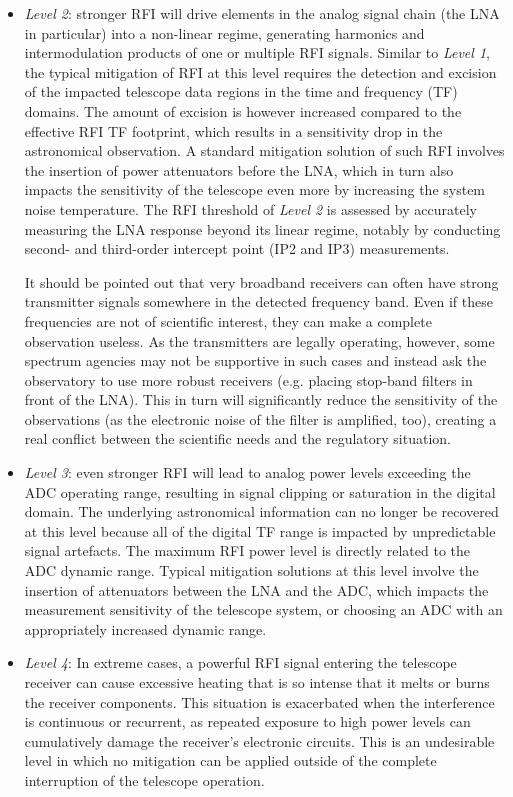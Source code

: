 \begin{itemize}
\item \emph{Level 2}: stronger RFI will drive elements in the analog signal chain (the LNA in particular) into a non-linear regime, generating harmonics and intermodulation products of one or multiple RFI signals. Similar to \emph{Level 1}, the typical mitigation of RFI at this level requires the detection and excision of the impacted telescope data regions in the time and frequency (TF) domains. The amount of excision is however increased compared to the effective RFI TF footprint, which results in a sensitivity drop in the astronomical observation. A standard mitigation solution of such RFI involves the insertion of power attenuators before the LNA, which in turn also impacts the sensitivity of the telescope even more by increasing the system noise temperature. The RFI threshold of \emph{Level 2} is assessed by accurately measuring the LNA response beyond its linear regime, notably by conducting second- and third-order intercept point (IP2 and IP3) measurements.

It should be pointed out that very broadband receivers can often have strong transmitter signals somewhere in the detected frequency band. Even if these frequencies are not of scientific interest, they can make a complete observation useless. As the transmitters are legally operating, however, some spectrum agencies may not be supportive in such cases and instead ask the observatory to use more robust receivers (e.g. placing stop-band filters in front of the LNA). This in turn will significantly reduce the sensitivity of the observations (as the electronic noise of the filter is amplified, too), creating a real conflict between the scientific needs and the regulatory situation. 

\item \emph{Level 3}: even stronger RFI will lead to analog power levels exceeding the ADC operating range, resulting in signal clipping or saturation in the digital domain. The underlying astronomical information can no longer be recovered at this level because all of the digital TF range is impacted by unpredictable signal artefacts. The maximum RFI power level is directly related to the ADC dynamic range. Typical mitigation solutions at this level involve the insertion of attenuators between the LNA and the ADC, which impacts the measurement sensitivity of the telescope system, or choosing an ADC with an appropriately increased dynamic range.

\item \emph{Level 4}: In extreme cases, a powerful RFI signal entering the telescope receiver can cause excessive heating that is so intense that it melts or burns the receiver components. This situation is exacerbated when the interference is continuous or recurrent, as repeated exposure to high power levels can cumulatively damage the receiver's electronic circuits. This is an undesirable level in which no mitigation can be applied outside of the complete interruption of the telescope operation.
\end{itemize}

